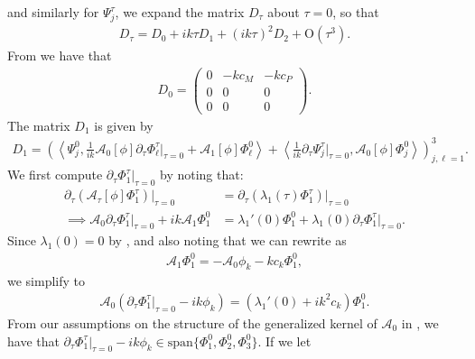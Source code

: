 \documentclass[11pt,leqno]{article}
\numberwithin{equation}{section}
\newcommand\nn{\nonumber}
\theoremstyle{definition}
\begin{document}
and similarly for $ \Psi_{j}^{\tau} $, we expand the matrix $ D_{\tau} $ about $ \tau = 0 $, so that
\begin{align*}
	D_{\tau} = D_{0} + ik\tau D_{1} + (ik\tau)^{2}D_{2} + \mathrm{O}(\tau^{3}).
\end{align*}
From  we have that
\begin{align*}
	D_{0} = \begin{pmatrix}
		0 & -kc_{M} & -kc_{P}\\
		0 & 0 & 0\\
		0 & 0 & 0
	\end{pmatrix}.
\end{align*}
The matrix $ D_{1} $ is given by
\begin{align}
	D_{1} = \left(\left\langle\Psi_{j}^{0}, \frac{1}{ik}\mathcal{A}_{0}[\phi]\partial_{\tau}\Phi_{\ell}^{\tau}\bigg|_{\tau = 0} + \mathcal{A}_{1}[\phi]\Phi_{\ell}^{0}\right\rangle + \left\langle\frac{1}{ik}\partial_{\tau}\Psi_{j}^{\tau}\bigg|_{\tau = 0},\mathcal{A}_{0}[\phi]\Phi_{j}^{0} \right\rangle\right)_{j,\ell = 1}^{3}.\label{eq:D1}
\end{align}
We first compute $ \partial_{\tau}\Phi_{1}^{\tau}\big|_{\tau = 0} $ by noting that:
\begin{align}
	\partial_{\tau}(\mathcal{A}_{\tau}[\phi]\Phi_{1}^{\tau})\big|_{\tau = 0} &= \partial_{\tau}(\lambda_{1}(\tau)\Phi_{1}^{\tau})\big|_{\tau = 0}\nn\\
	\implies \mathcal{A}_{0}\partial_{\tau}\Phi_{1}^{\tau}\big|_{\tau = 0} + ik\mathcal{A}_{1}\Phi_{1}^{0} &= \lambda_{1}'(0)\Phi_{1}^{0} + \lambda_{1}(0)\partial_{\tau}\Phi_{1}^{\tau}\big|_{\tau = 0}.\label{eq:phitauderiv}
\end{align}
Since $ \lambda_{1}(0) = 0 $ by , and also noting that we can rewrite  as
\begin{align}
	\mathcal{A}_{1}\Phi_{1}^{0} = -\mathcal{A}_{0}\phi_{k} - kc_{k}\Phi_{1}^{0},\label{eq:A1Phi1}
\end{align}
we simplify  to
\begin{align*}
	\mathcal{A}_{0}\left(\partial_{\tau}\Phi_{1}^{\tau}\big|_{\tau = 0} - ik\phi_{k}\right) = (\lambda_{1}'(0) + ik^{2}c_{k})\Phi_{1}^{0}.
\end{align*}
From our assumptions on the structure of the generalized kernel of $ \mathcal{A}_{0} $ in , we have that $ \partial_{\tau}\Phi_{1}^{\tau}\big|_{\tau = 0} - ik\phi_{k} \in \mathrm{span}\{\Phi_{1}^{0},\Phi_{2}^{0},\Phi_{3}^{0}\} $. If we let
\end{document}
